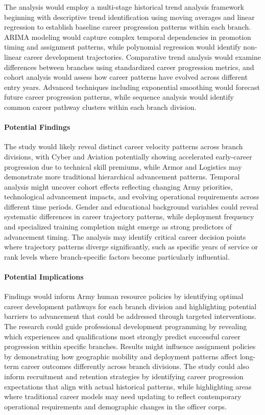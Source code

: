 \documentclass[./main.tex]{subfiles}
\begin{document}
The analysis would employ a multi-stage historical trend analysis
framework beginning with descriptive trend identification using moving
averages and linear regression to establish baseline career progression
patterns within each branch. ARIMA modeling would capture complex
temporal dependencies in promotion timing and assignment patterns, while
polynomial regression would identify non-linear career development
trajectories. Comparative trend analysis would examine differences
between branches using standardized career progression metrics, and
cohort analysis would assess how career patterns have evolved across
different entry years. Advanced techniques including exponential
smoothing would forecast future career progression patterns, while
sequence analysis would identify common career pathway clusters within
each branch division.

\paragraph{Potential Findings}\label{potential-findings}

The study would likely reveal distinct career velocity patterns across
branch divisions, with Cyber and Aviation potentially showing
accelerated early-career progression due to technical skill premiums,
while Armor and Logistics may demonstrate more traditional hierarchical
advancement patterns. Temporal analysis might uncover cohort effects
reflecting changing Army priorities, technological advancement impacts,
and evolving operational requirements across different time periods.
Gender and educational background variables could reveal systematic
differences in career trajectory patterns, while deployment frequency
and specialized training completion might emerge as strong predictors of
advancement timing. The analysis may identify critical career decision
points where trajectory patterns diverge significantly, such as specific
years of service or rank levels where branch-specific factors become
particularly influential.

\paragraph{Potential Implications}\label{potential-implications}

Findings would inform Army human resource policies by identifying
optimal career development pathways for each branch division and
highlighting potential barriers to advancement that could be addressed
through targeted interventions. The research could guide professional
development programming by revealing which experiences and
qualifications most strongly predict successful career progression
within specific branches. Results might influence assignment policies by
demonstrating how geographic mobility and deployment patterns affect
long-term career outcomes differently across branch divisions. The study
could also inform recruitment and retention strategies by identifying
career progression expectations that align with actual historical
patterns, while highlighting areas where traditional career models may
need updating to reflect contemporary operational requirements and
demographic changes in the officer corps.
\end{document}
